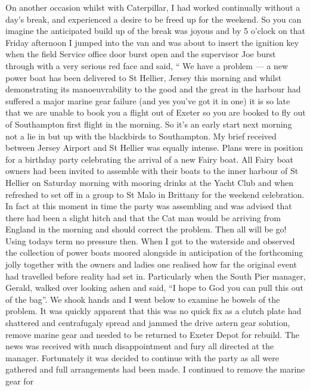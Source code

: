 
On another occasion whilst with Caterpillar, I had worked continually without a
day's break, and experienced a desire to be freed up for the weekend. So you
can imagine the anticipated build up of the break was joyous and by 5 o'clock
on that Friday afternoon I jumped into the van and was about to insert the
ignition key when the field Service office door burst open and the supervisor
Joe burst through with a very serious red face and said, `` We have a
problem --- a new power boat has been delivered to St Hellier, Jersey this
morning and whilst demonstrating its manoeuvrability to the good and the great
in the harbour had suffered a major marine gear failure (and yes you've got it
in one) it is so late that we are unable to book you a flight out of Exeter so
you are booked to fly out of Southampton first flight in the morning. So it's
an early start next morning not a lie in but up with the blackbirds to
Southampton. My brief received between Jersey Airport and St Hellier was
equally intense. Plans were in position for a birthday party celebrating the
arrival of a new Fairy boat. All Fairy boat owners had been invited to assemble
with their boats to the inner harbour of St Hellier on Saturday morning with
mooring drinks at the Yacht Club and when refreshed to set off in a group to St
Malo in Brittany for the weekend celebration. In fact at this moment in time
the party was assembling and was advised that there had been a slight hitch and
that the Cat man would be arriving from England in the morning and should
correct the problem. Then all will be go! Using todays term no pressure then.
When I got to the waterside and observed the collection of power boats moored
alongside in anticipation of the forthcoming jolly together with the owners and
ladies one realised how far the original event had travelled before reality had
set in. Particularly when the South Pier manager, Gerald, walked over looking
ashen and said, ``I hope to God you can pull this out of the bag''. We shook
hands and I went below to examine he bowels of the problem. It was quickly
apparent that this was no quick fix as a clutch plate had shattered and
centrafugaly spread and jammed the drive astern gear solution, remove marine
gear and needed to be returned to Exeter Depot for rebuild. The news was
received with much disappointment and fury all directed at the manager.
Fortunately it was decided to continue with the party as all were gathered and
full arrangements had been made. I continued to remove the marine gear for
